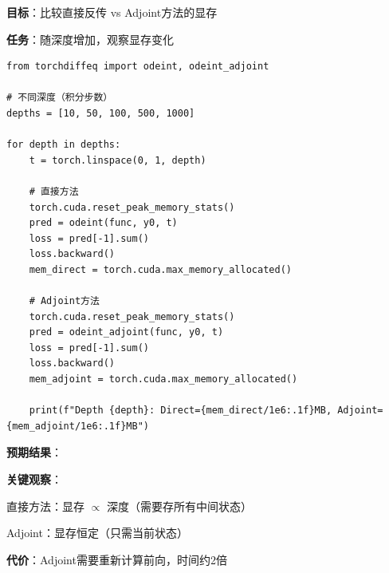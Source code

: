 \documentclass[12pt, a4paper]{ctexart}
\begin{document}
\begin{experiment}[实验10b：Adjoint方法对比（12分钟）]

\textbf{目标}：比较直接反传 vs Adjoint方法的显存

\textbf{任务}：随深度增加，观察显存变化

\begin{lstlisting}
from torchdiffeq import odeint, odeint_adjoint

# 不同深度（积分步数）
depths = [10, 50, 100, 500, 1000]

for depth in depths:
    t = torch.linspace(0, 1, depth)
    
    # 直接方法
    torch.cuda.reset_peak_memory_stats()
    pred = odeint(func, y0, t)
    loss = pred[-1].sum()
    loss.backward()
    mem_direct = torch.cuda.max_memory_allocated()
    
    # Adjoint方法
    torch.cuda.reset_peak_memory_stats()
    pred = odeint_adjoint(func, y0, t)
    loss = pred[-1].sum()
    loss.backward()
    mem_adjoint = torch.cuda.max_memory_allocated()
    
    print(f"Depth {depth}: Direct={mem_direct/1e6:.1f}MB, Adjoint={mem_adjoint/1e6:.1f}MB")
\end{lstlisting}

\end{experiment}

\begin{experiment}[实验10b续：显存分析]

\textbf{预期结果}：

\begin{center}
\end{center}

\textbf{关键观察}：

直接方法：显存 $\propto$ 深度（需要存所有中间状态）

Adjoint：显存恒定（只需当前状态）

\textbf{代价}：Adjoint需要重新计算前向，时间约2倍

\end{experiment}
\end{document}
